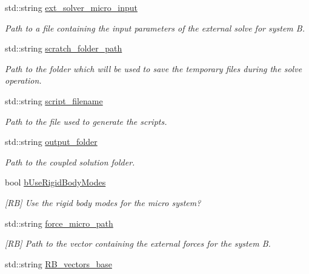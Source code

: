 \begin{DoxyCompactItemize}
std\+::string \hyperlink{structcarl_1_1feti__setup__init__params_a27dfcdd54488314398184e8f7a989ab2}{ext\+\_\+solver\+\_\+micro\+\_\+input}
\begin{DoxyCompactList}\small\item\em Path to a file containing the input parameters of the external solve for system B. \end{DoxyCompactList}\item 
std\+::string \hyperlink{structcarl_1_1feti__setup__init__params_a57e553748427905076bae85d239f9537}{scratch\+\_\+folder\+\_\+path}
\begin{DoxyCompactList}\small\item\em Path to the folder which will be used to save the temporary files during the solve operation. \end{DoxyCompactList}\item 
std\+::string \hyperlink{structcarl_1_1feti__setup__init__params_a7e27a98f8d0d0d5b6381ba9fd40f777b}{script\+\_\+filename}
\begin{DoxyCompactList}\small\item\em Path to the file used to generate the scripts. \end{DoxyCompactList}\item 
std\+::string \hyperlink{structcarl_1_1feti__setup__init__params_a30b5ce1bab947467d4bde48cf1fd0f67}{output\+\_\+folder}
\begin{DoxyCompactList}\small\item\em Path to the coupled solution folder. \end{DoxyCompactList}\item 
bool \hyperlink{structcarl_1_1feti__setup__init__params_af4191df4632d21bed2b302c08d113d14}{b\+Use\+Rigid\+Body\+Modes}
\begin{DoxyCompactList}\small\item\em \mbox{[}R\+B\mbox{]} Use the rigid body modes for the micro system? \end{DoxyCompactList}\item 
std\+::string \hyperlink{structcarl_1_1feti__setup__init__params_a9a2c30eed9e7c5c912e011fa55a776de}{force\+\_\+micro\+\_\+path}
\begin{DoxyCompactList}\small\item\em \mbox{[}R\+B\mbox{]} Path to the vector containing the external forces for the system B. \end{DoxyCompactList}\item 
std\+::string \hyperlink{structcarl_1_1feti__setup__init__params_aa70293e2d51c3475ebbdda0e338e8bbb}{R\+B\+\_\+vectors\+\_\+base}

\end{DoxyCompactItemize}
